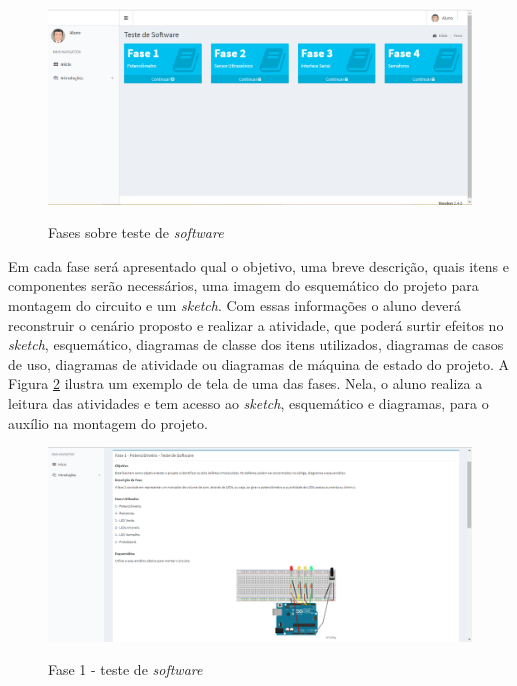 \begin{figure}[!htb]
    \centering
    \caption{Fases sobre teste de \textit{software}}
    \includegraphics[width=1\textwidth]{./dados/figuras/fasesTela}
    \label{fig:figura-fases-telas}
\end{figure}
 
Em cada fase será apresentado qual o objetivo, uma breve descrição, quais itens e componentes serão necessários, uma imagem do esquemático do projeto para montagem do circuito e um \textit{sketch}. Com essas informações o aluno deverá reconstruir o cenário proposto e realizar a atividade, que poderá surtir efeitos no \textit{sketch}, esquemático, diagramas de classe dos itens utilizados, diagramas de casos de uso, diagramas de atividade ou diagramas de máquina de estado do projeto. A Figura \ref{fig:figura-fase-tela} ilustra um exemplo de tela de uma das fases. Nela, o aluno realiza a leitura das atividades e tem acesso ao \textit{sketch}, esquemático e diagramas, para o auxílio na montagem do projeto. 
\begin{figure}[!htb]
    \centering
    \caption{Fase 1 - teste de \textit{software}}
    \includegraphics[width=1\textwidth]{./dados/figuras/faseTela}
    \label{fig:figura-fase-tela}
\end{figure}

